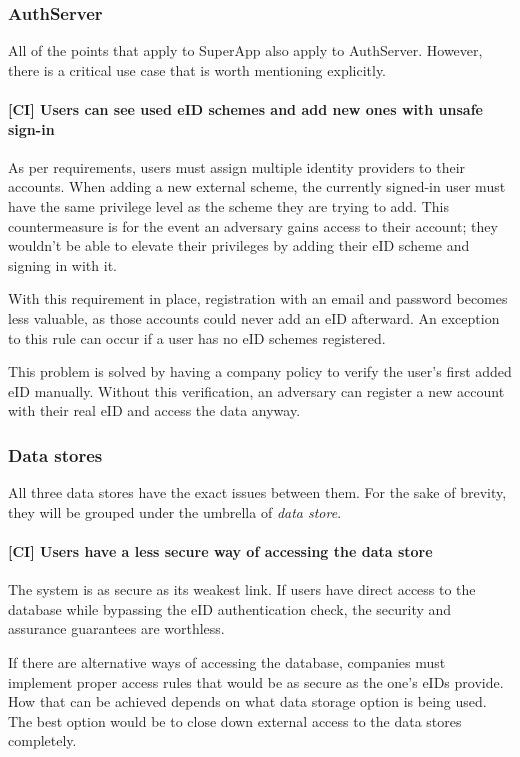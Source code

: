 \subsubsection{AuthServer}

All of the points that apply to SuperApp also apply to AuthServer. However, there is a critical use case that is worth mentioning explicitly.

\paragraph{[CI] Users can see used eID schemes and add new ones with unsafe sign-in}

As per requirements, users must assign multiple identity providers to their accounts. When adding a new external scheme, the currently signed-in user must have the same privilege level as the scheme they are trying to add. This countermeasure is for the event an adversary gains access to their account; they wouldn't be able to elevate their privileges by adding their eID scheme and signing in with it.

With this requirement in place, registration with an email and password becomes less valuable, as those accounts could never add an eID afterward. An exception to this rule can occur if a user has no eID schemes registered.

This problem is solved by having a company policy to verify the user's first added eID manually. Without this verification, an adversary can register a new account with their real eID and access the data anyway.

\subsubsection{Data stores}

All three data stores have the exact issues between them. For the sake of brevity, they will be grouped under the umbrella of \textit{data store}.

\paragraph{[CI] Users have a less secure way of accessing the data store}

The system is as secure as its weakest link. If users have direct access to the database while bypassing the eID authentication check, the security and assurance guarantees are worthless.

If there are alternative ways of accessing the database, companies must implement proper access rules that would be as secure as the one's eIDs provide. How that can be achieved depends on what data storage option is being used. The best option would be to close down external access to the data stores completely.

